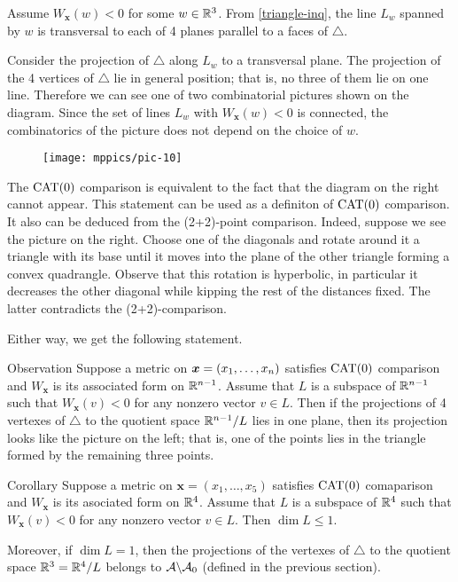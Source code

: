 \documentclass{article}
\begin{document}
Assume $W_{\bm{x}}(w)<0$ for some $w\in\mathbb{R}^3$.
From \ref{triangle-inq}, the line $L_w$ spanned by
$w$ is transversal to each of 4 planes parallel to a faces of $\triangle$.

Consider the projection of $\triangle$ along $L_w$ to a transversal plane. 
The projection of the 4 vertices of $\triangle$ lie in general position; 
that is, no three of them lie on one line.
Therefore  we can see one of two combinatorial pictures shown on the diagram.
Since the set of lines $L_w$ with $W_{\bm{x}}(w)<0$ is connected,
the combinatorics of the picture does not depend on the choice of $w$.

\begin{wrapfigure}{r}{33mm}
\vskip-2mm
\centering
\texttt{[image: mppics/pic-10]}
\end{wrapfigure}

The $\mathrm{CAT}(0)$ comparison is equivalent to the fact that the diagram on the right cannot appear.
This statement can be used as a definiton of $\mathrm{CAT}(0)$ comparison.
It also can be deduced from the (2+2)-point comparison.
Indeed, suppose we see the picture on the right.
Choose one of the diagonals and rotate  around it a triangle with its base until it moves into the plane of the other triangle forming a convex quadrangle.
Observe that this rotation is hyperbolic, in particular it decreases the other diagonal while kipping the rest of the distances fixed.
The latter contradicts the (2+2)-comparison.


Either way, we get the following statement.


\begin{thm}{Observation}\label{cat0-proj}
Suppose a metric on $\bm{x}\z=(x_1,\dots,x_n)$ satisfies $\mathrm{CAT}(0)$ comparison
and $W_{\bm{x}}$ is its associated form on $\mathbb{R}^{n-1}$.
Assume that $L$ is a subspace of $\mathbb{R}^{n-1}$ such that
$W_{\bm{x}}(v)< 0$ for any nonzero vector $v\in L$.
Then if the projections of 4 vertexes of $\triangle$ to the quotient space $\mathbb{R}^{n-1}/L$ lies in one plane, then its projection looks like the picture on the left;
that is, one of the points lies in the triangle formed by the remaining three points.
\end{thm}

\begin{thm}{Corollary}\label{cor:3+2}
Suppose a metric on $\bm{x}=(x_1,\dots,x_5)$ satisfies $\mathrm{CAT}(0)$ comaparison
and $W_{\bm{x}}$ is its asociated form on $\mathbb{R}^{4}$.
Assume that $L$ is a subspace of $\mathbb{R}^{4}$ such that
$W_{\bm{x}}(v)< 0$ for any nonzero vector $v\in L$.
Then $\dim L\le 1$.

Moreover, if $\dim L= 1$, then the projections of the vertexes of $\triangle$ to the quotient space $\mathbb{R}^3=\mathbb{R}^4/L$ belongs to $\mathcal{A}\backslash\mathcal{A}_0$ (defined in the previous section). 
\end{thm}
\end{document}

